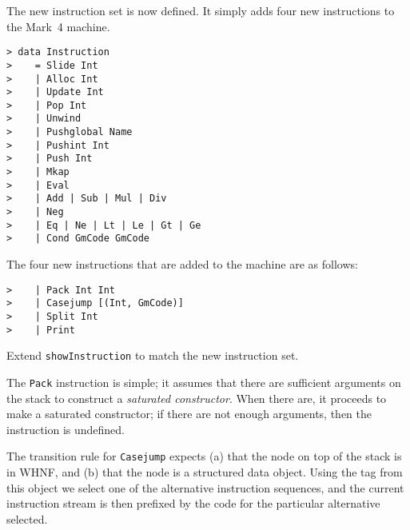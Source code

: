 The new instruction set is now defined. It simply adds four new instructions to
the Mark~4 machine.
\begin{verbatim}
> data Instruction 
>    = Slide Int
>    | Alloc Int
>    | Update Int
>    | Pop Int
>    | Unwind
>    | Pushglobal Name
>    | Pushint Int
>    | Push Int
>    | Mkap
>    | Eval
>    | Add | Sub | Mul | Div
>    | Neg
>    | Eq | Ne | Lt | Le | Gt | Ge
>    | Cond GmCode GmCode
\end{verbatim}
%
%
%
%
%
%
%
%
%
%
%
%
%
%
%
%
%
%
%
%
%
%
The four new instructions that are added to the machine are as follows:
\begin{verbatim}
>    | Pack Int Int
>    | Casejump [(Int, GmCode)]
>    | Split Int
>    | Print
\end{verbatim}
%
%
%
%
\begin{exercise}\label{gm:X:showInstruction5}
Extend \mbox{\tt showInstruction} to match the new instruction set.
\end{exercise}

The \mbox{\tt Pack} instruction is simple; it assumes that there are
sufficient arguments on the stack to construct a {\em saturated
constructor}.  When there are, it
proceeds to make a saturated constructor; if there are not enough
arguments, then the instruction is undefined.

\gmruleod%
{}%
{}

The transition rule for \mbox{\tt Casejump} expects (a) that the node
on top of the stack is in WHNF, and (b) that
the node is a structured data object. Using the tag from this
object we select one of the alternative instruction sequences, and
the current instruction stream is then prefixed by the code for the
particular alternative selected.

\gmruleod%
{}%
{}

